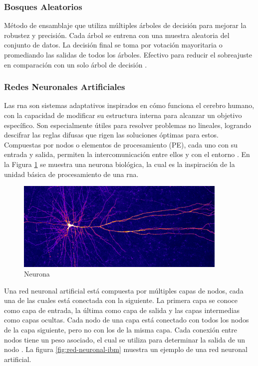 \subsubsection{Bosques Aleatorios}
Método de ensamblaje que utiliza múltiples árboles de decisión para mejorar la
robustez y precisión. Cada árbol se entrena con una muestra aleatoria del
conjunto de datos. La decisión final se toma por votación mayoritaria o
promediando las salidas de todos los árboles. Efectivo para reducir el sobreajuste
en comparación con un solo árbol de decisión \cite{10.1145/1143844.1143865}.

\subsubsection{Redes Neuronales Artificiales}
Las \acrfull{rna} son sistemas adaptativos inspirados en
cómo funciona el cerebro humano, con la capacidad de modificar su estructura
interna para alcanzar un objetivo específico. Son especialmente útiles para
resolver problemas no lineales, logrando descifrar las reglas difusas que rigen
las soluciones óptimas para estos. Compuestas por nodos o elementos de
procesamiento (PE), cada uno con su entrada y salida, permiten la
intercomunicación entre ellos y con el entorno \cite{grossi2007introduction}.
En la Figura \ref{fig:neurona} se muestra una neurona biológica, la cual es la
inspiración de la unidad básica de procesamiento de una \acrshort{rna}.

\begin{figure}[!htbp]
  \centering
  \includegraphics[width=0.9\textwidth]{imagenes/02-marco-teorico/red-neuronal-dendritas.jpg}
  \caption[Neurona]{Neurona \cite{vida_neurocure_2020}}
  \label{fig:neurona}
\end{figure}

Una red neuronal artificial está compuesta por múltiples capas de nodos, cada
una de las cuales está conectada con la siguiente. La primera capa se conoce como
capa de entrada, la última como capa de salida y las capas intermedias como capas
ocultas. Cada nodo de una capa está conectado con todos los nodos de la capa
siguiente, pero no con los de la misma capa. Cada conexión entre nodos tiene un
peso asociado, el cual se utiliza para determinar la salida de un nodo \cite{ibm2023redneuronal}. La
figura \ref{fig:red-neuronal-ibm} muestra un ejemplo de una red neuronal artificial.

